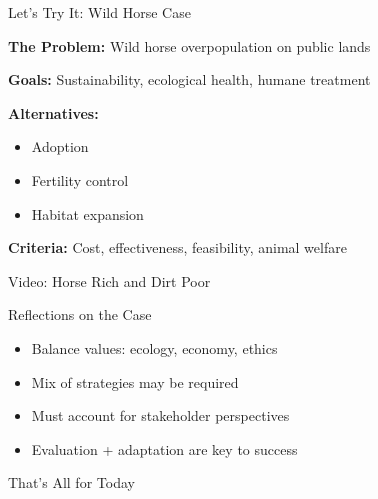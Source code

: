 \documentclass[10pt]{beamer}
\begin{document}
\begin{frame}{Let’s Try It: Wild Horse Case}

\begin{block}{}
    \textbf{The Problem:} Wild horse overpopulation on public lands

    \textbf{Goals:} Sustainability, ecological health, humane treatment

    \textbf{Alternatives:}
    \begin{itemize}
        \item Adoption
        \item Fertility control
        \item Habitat expansion
    \end{itemize}

    \textbf{Criteria:} Cost, effectiveness, feasibility, animal welfare
\end{block}

\end{frame}


\begin{frame}{Video: Horse Rich and Dirt Poor}


\end{frame}


\begin{frame}{Reflections on the Case}

\begin{block}{}
    \begin{itemize}
        \item Balance values: ecology, economy, ethics
        \item Mix of strategies may be required
        \item Must account for stakeholder perspectives
        \item Evaluation + adaptation are key to success
    \end{itemize}
\end{block}

\end{frame}


\begin{frame}{That's All for Today}

\centering
{}

\end{frame}
\end{document}
